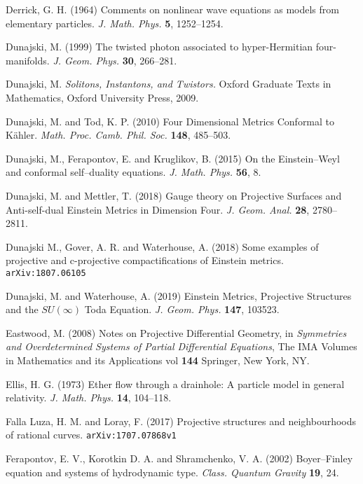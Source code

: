 \begin{thebibliography}{}

 Derrick, G. H. (1964)
Comments on nonlinear wave equations as models from elementary particles. \textit{J. Math. Phys.} {\bf 5}, 1252--1254.



 Dunajski, M. (1999) The twisted photon associated to hyper-Hermitian four-manifolds. \textit{J. Geom. Phys.} {\bf 30}, 266--281.

 Dunajski, M. \textit{Solitons, Instantons, and Twistors.} Oxford Graduate Texts in Mathematics, Oxford University Press, 2009.

 Dunajski, M. and Tod, K. P. (2010) Four Dimensional Metrics Conformal to K\"ahler. \textit{Math. Proc. Camb. Phil. Soc.} {\bf 148}, 485--503.

 Dunajski, M., Ferapontov, E. and Kruglikov, B. (2015)
On the Einstein--Weyl and conformal self--duality equations. \textit{J. Math. Phys.} {\bf 56}, 8.

 Dunajski, M. and Mettler, T. (2018) Gauge theory on Projective Surfaces and Anti-self-dual Einstein Metrics in Dimension Four.  
\textit{J. Geom. Anal.} {\bf 28}, 2780--2811.

 Dunajski M., Gover, A. R. and Waterhouse, A. (2018) Some examples of projective and c-projective compactifications of Einstein metrics.  {\tt arXiv:1807.06105}

 
 Dunajski, M. and Waterhouse, A. (2019)
Einstein Metrics, Projective Structures and the $SU(\infty)$ Toda Equation.
\textit{J. Geom. Phys.} {\bf 147}, 103523.

 Eastwood, M. (2008)
Notes on Projective Differential Geometry, in \textit{Symmetries and Overdetermined Systems of Partial Differential Equations}, The IMA Volumes in Mathematics and its Applications vol {\bf 144} Springer, New York, NY.

 Ellis, H. G. (1973)
Ether flow through a drainhole: A particle model in general relativity. \textit{J. Math. Phys.} {\bf 14}, 104--118.

 Falla Luza, H. M. and Loray, F. (2017)  Projective structures and neighbourhoods of rational curves. {\tt arXiv:1707.07868v1}

  Ferapontov, E.  V., Korotkin D. A.  and Shramchenko, V. A. (2002)
Boyer–Finley equation and systems of hydrodynamic type.
\textit{Class. Quantum Gravity} {\bf 19}, 24.


\end{thebibliography}
